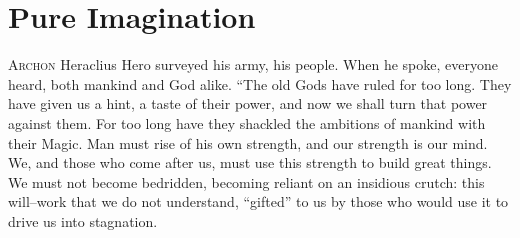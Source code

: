 \chapter{Pure Imagination}


\lettrine{A}{rchon} Heraclius Hero surveyed his army, his people. When he spoke, everyone heard, both mankind and God alike.
\SmallVSpace
“The old Gods have ruled for too long. They have given us a hint, a taste of their power, and now we shall turn that power against them. For too long have they shackled the ambitions of mankind with their Magic. Man must rise of his own strength, and our strength is our mind. We, and those who come after us, must use this strength to build great things. We must not become bedridden, becoming reliant on an insidious crutch: this will\mbox{--}work that we do not understand, “gifted” to us by those who would use it to drive us into stagnation.

